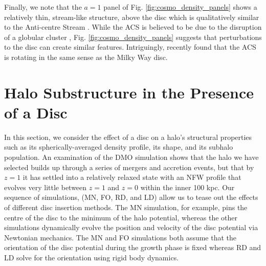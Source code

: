 Finally, we note that the $a=1$ panel of Fig. \ref{fig:cosmo_density_panels}
shows a relatively thin, stream-like structure, above the disc which
is qualitatively similar to the Anti-centre Stream \citep[ACS,][]{acs_disc}. While the ACS
is believed to be due to the disruption of a globular cluster \citep[e.g.][]{acs_disc}, Fig. \ref{fig:cosmo_density_panels} suggests that perturbations to the disc can create similar features. Intriguingly, \citep{de_boer_et_al_2017} recently 
found that the ACS is rotating in the same sense as the Milky Way disc.



\section{Halo Substructure in the Presence of a Disc}

In this section, we consider the effect of a disc on a halo's
structural properties such as its spherically-averaged density
profile, its shape, and its subhalo population.  An examination of the
DMO simulation shows that the halo we have selected builds up through a
series of mergers and accretion events, but that by $z=1$ it has
settled into a relatively relaxed state with an NFW profile that
evolves very little between $z=1$ and $z=0$ within the inner 100 kpc.  Our sequence of
simulations, (MN, FO, RD, and LD) allow us to tease out the effects of
different disc insertion methods.  The MN simulation, for example,
pins the centre of the disc to the minimum of the halo potential,
whereas the other simulations dynamically evolve the position and
velocity of the disc potential via Newtonian mechanics.  The MN and FO
simulations both assume that the orientation of the disc potential
during the growth phase is fixed whereas RD and LD solve for the
orientation using rigid body dynamics.
 
